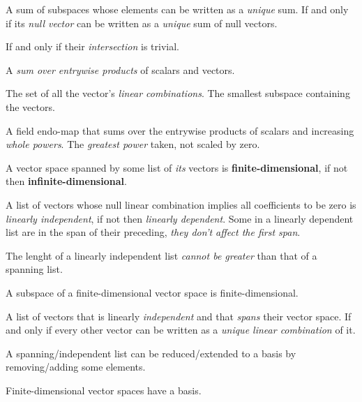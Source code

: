 \begin{multicols}{3}
  A sum of subspaces whose elements can be written as a \textit{unique} sum.
  If and only if its \textit{null vector} can be written as a \textit{unique} sum of null vectors.

  If and only if their \textit{intersection} is trivial.

  A \textit{sum over entrywise products} of scalars and vectors.
  
  The set of all the vector's \textit{linear combinations}.
  The smallest subspace containing the vectors.

  A field endo-map that sums over the entrywise products of scalars and increasing \textit{whole powers}.
  The \textit{greatest power} taken, not scaled by zero.
  
  A vector space spanned by some list of \textit{its} vectors
  is \textbf{finite-dimensional},
  if not then \textbf{infinite-dimensional}.
  
  A list of vectors whose null linear combination implies all coefficients to be zero is \textit{linearly independent},
  if not then \textit{linearly dependent}.
  Some in a linearly dependent list are in the span of their preceding, \textit{they don't affect the first span}.
  
  The lenght of a linearly independent list \textit{cannot be greater} than that of a spanning list.
  
  A subspace of a finite-dimensional vector space is finite-dimensional.
  
  A list of vectors that is linearly \textit{independent} and that \textit{spans} their vector space.
  If and only if every other vector can be written as a \textit{unique linear combination} of it.
  
  A spanning/independent list can be reduced/extended to a basis by removing/adding some elements.

  Finite-dimensional vector spaces have a basis.
  

\end{multicols}
